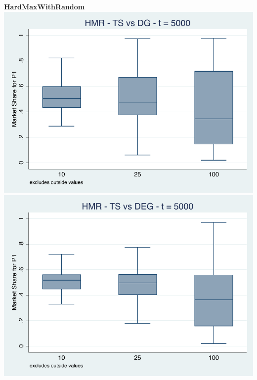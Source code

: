 \documentclass[11pt,letterpaper]{article}
\begin{document}
\pagebreak
\textbf{HardMaxWithRandom}  \\
\includegraphics[scale=0.9]{hmr_ts_dg_memory_5000} \\ \includegraphics[scale=0.9]{hmr_ts_deg_memory_5000}
\end{document}
